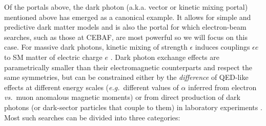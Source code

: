 Of the portals above, the dark photon (a.k.a. vector or kinetic mixing portal) mentioned above has emerged as a canonical example. It allows for simple and predictive dark matter models and is also the portal for which electron-beam searches, such as those at CEBAF, are most powerful so we will focus on this case.  For massive dark photons, kinetic mixing of strength $\epsilon$ induces couplings $\epsilon e$ to SM matter of electric charge $e$ \cite{Holdom:1985ag, Okun:1982xi}. Dark photon exchange effects are parametrically smaller than their electromagnetic counterparts and respect the same symmetries, but can be constrained either by the \emph{difference} of QED-like effects at different energy scales (\emph{e.g.}~different values of $\alpha$ inferred from electron \emph{vs.}~muon anomalous magnetic moments) or from direct production of dark photons (or dark-sector particles that couple to them) in laboratory experiments \cite{Pospelov:2008zw}. Most such searches can be divided into three categories:
